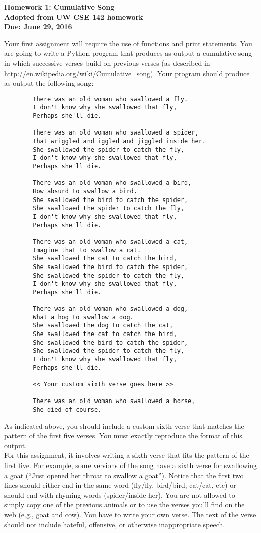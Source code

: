 \documentclass[12pt]{article}
\theoremstyle{definition}
\theoremstyle{definition}
\theoremstyle{remark}
\theoremstyle{remark}
\begin{document}
	\begin{center}
		\Large{\textbf{Homework 1: Cumulative Song}} \\
		\textbf{Adopted from UW CSE 142 homework} \\
		\textbf{Due: June 29, 2016}
	\end{center}
	Your first assignment will require the use of functions and print statements. You are going to write a Python program that produces as output a cumulative song in which successive verses build on previous verses (as described in http://en.wikipedia.org/wiki/Cumulative\_song).  Your program should produce as output the following song:
	
	\begin{verbatim}
		There was an old woman who swallowed a fly.
		I don't know why she swallowed that fly,
		Perhaps she'll die.
		
		There was an old woman who swallowed a spider,
		That wriggled and iggled and jiggled inside her.
		She swallowed the spider to catch the fly,
		I don't know why she swallowed that fly,
		Perhaps she'll die.
		
		There was an old woman who swallowed a bird,
		How absurd to swallow a bird.
		She swallowed the bird to catch the spider,
		She swallowed the spider to catch the fly,
		I don't know why she swallowed that fly,
		Perhaps she'll die.
		
		There was an old woman who swallowed a cat,
		Imagine that to swallow a cat.
		She swallowed the cat to catch the bird,
		She swallowed the bird to catch the spider,
		She swallowed the spider to catch the fly,
		I don't know why she swallowed that fly,
		Perhaps she'll die.
		
		There was an old woman who swallowed a dog,
		What a hog to swallow a dog.
		She swallowed the dog to catch the cat,
		She swallowed the cat to catch the bird,
		She swallowed the bird to catch the spider,
		She swallowed the spider to catch the fly,
		I don't know why she swallowed that fly,
		Perhaps she'll die.
		
		<< Your custom sixth verse goes here >>
		
		There was an old woman who swallowed a horse,
		She died of course.
	\end{verbatim}
	\noindent
	As indicated above, you should include a custom sixth verse that matches the pattern of the first five verses.  You must exactly reproduce the format of this output. \\
	
	\noindent
	For this assignment, it involves writing a sixth verse that fits the pattern of the first five.  For example, some versions of the song have a sixth verse for swallowing a goat (“Just opened her throat to swallow a goat”).  Notice that the first two lines should either end in the same word (fly/fly, bird/bird, cat/cat, etc) or should end with rhyming words (spider/inside her).  You are not allowed to simply copy one of the previous animals or to use the verses you’ll find on the web (e.g., goat and cow).  You have to write your own verse.  The text of the verse should not include hateful, offensive, or otherwise inappropriate speech.
	
\end{document}
